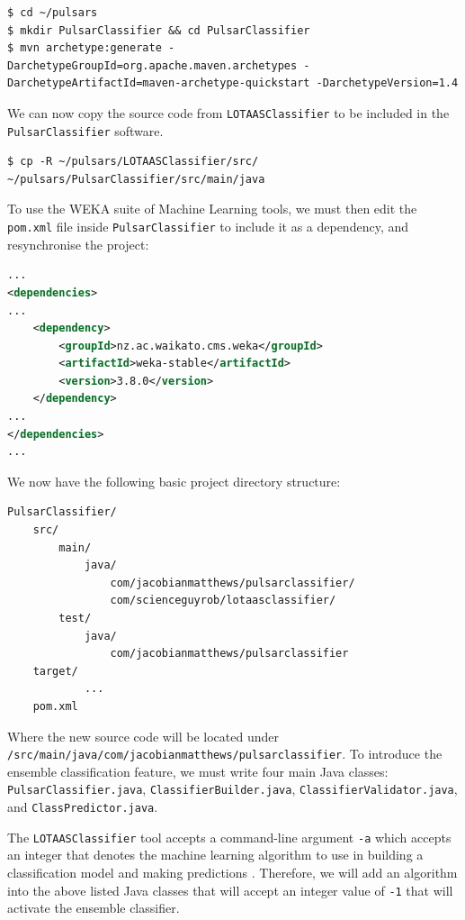 \documentclass{article}
\begin{document}
\begin{lstlisting}[numbers=none]
$ cd ~/pulsars
$ mkdir PulsarClassifier && cd PulsarClassifier
$ mvn archetype:generate -DarchetypeGroupId=org.apache.maven.archetypes -DarchetypeArtifactId=maven-archetype-quickstart -DarchetypeVersion=1.4
\end{lstlisting}

We can now copy the source code from \verb|LOTAASClassifier| to be included in the \verb|PulsarClassifier| software.

\begin{lstlisting}[numbers=none]
$ cp -R ~/pulsars/LOTAASClassifier/src/ ~/pulsars/PulsarClassifier/src/main/java
\end{lstlisting}

To use the WEKA suite of Machine Learning tools, we must then edit the \verb|pom.xml| file inside \verb|PulsarClassifier| to include it as a dependency, and resynchronise the project:\\

\begin{lstlisting}[numbers=none, title=pom.xml, language=xml]
...
<dependencies>
...
    <dependency>
        <groupId>nz.ac.waikato.cms.weka</groupId>
        <artifactId>weka-stable</artifactId>
        <version>3.8.0</version>
    </dependency>
...
</dependencies>
...
\end{lstlisting}

We now have the following basic project directory structure:

\begin{lstlisting}[numbers=none]
PulsarClassifier/
    src/
        main/
            java/
                com/jacobianmatthews/pulsarclassifier/
                com/scienceguyrob/lotaasclassifier/
        test/
            java/
                com/jacobianmatthews/pulsarclassifier
    target/
            ...
    pom.xml
\end{lstlisting}

Where the new source code will be located under \\\verb|/src/main/java/com/jacobianmatthews/pulsarclassifier|. To introduce the ensemble classification feature, we must write four main Java classes: \\\verb|PulsarClassifier.java|,  \verb|ClassifierBuilder.java|,  \verb|ClassifierValidator.java|,  and \verb|ClassPredictor.java|.

The \verb|LOTAASClassifier| tool accepts a command-line argument \verb|-a| which accepts an integer that denotes the machine learning algorithm to use in building a classification model and making predictions \autocite{lyon}. Therefore, we will add an algorithm into the above listed Java classes that will accept an integer value of \verb|-1| that will activate the ensemble classifier.
\end{document}
